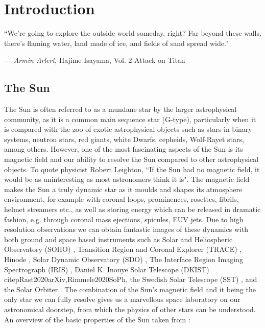 \documentclass[12pt]{ociamthesis}
\begin{document}
\chapter{Introduction}
\label{chap:intro}
\epigraph{``We're going to explore the outside world someday, right? Far beyond these walls, there's flaming water, land made of ice, and fields of sand spread wide."}{--- \textit{Armin Arlert}, \textup{Hajime Isayama}, Vol. 2  Attack on Titan}
\section{The Sun}
\label{sec:Sun}
The Sun is often referred to as a mundane star by the larger astrophysical community, as it is a common main sequence star (G-type), particularly when it is compared with the zoo of exotic astrophysical objects such as stars in binary systems, neutron stars, red giants, white Dwarfs, cepheids, Wolf-Rayet stars, among others. However, one of the most fascinating aspects of the Sun is its magnetic field and our ability to resolve the Sun compared to other astrophysical objects. To quote physicist Robert Leighton, ``If the Sun had no magnetic field, it would be as uninteresting as most astronomers think it is". The magnetic field makes the Sun a truly dynamic star as it moulds and shapes its atmosphere environment, for example with coronal loops, prominences, rosettes, fibrils, helmet streamers etc., as well as storing energy which can be released in dramatic fashion, e.g. through coronal mass ejections, spicules, EUV jets. Due to high resolution observations we can obtain fantastic images of these dynamics with both ground and space based instruments such as Solar and Heliospheric Observatory (SOHO) \citep{Domingo1995SSRv7281D}, Transition Region and Coronal Explorer (TRACE) \citep{Tarbell1994ESASP373375T}, Hinode \citep{Tsuneta2008SoPh,Suematsu2008SoPh,Ichimoto2008SoPh}, Solar Dynamic Observatory (SDO) \citep{Lemen2012SoPh27517L}, The Interface Region Imaging Spectrograph (IRIS) \citep{Pontieu2013SPD4403D}, Daniel K. Inouye Solar Telescope (DKIST) \\citep{Rast2020arXiv,Rimmele2020SoPh}, the Swedish Solar Telescope (SST) \citep{Scharmer2003SPIE}, and the Solar Orbiter \citep{sol_orb_2013SPIE8862E0EM}. The combination of the Sun's magnetic field and it being the only star we can fully resolve gives us a marvellous space laboratory on our astronomical doorstep, from which the physics of other stars can be understood. An overview of the basic properties of the Sun taken from \cite{priest2014magnetohydrodynamics}:
\end{document}
